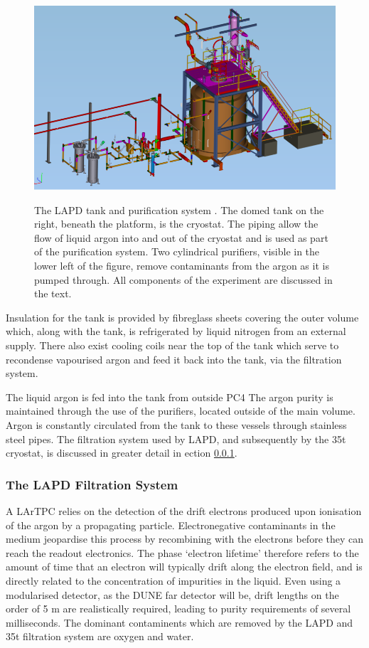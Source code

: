 \begin{figure}[ht]
  \centering
  \includegraphics[width=15cm]{LAPDTankPiping.png}
  \label{fig:LAPDTankPiping}
  \caption{The LAPD tank and purification system \cite{LAPD}.  The domed tank on the right, beneath the platform, is the cryostat.  The piping allow the flow of liquid argon into and out of the cryostat and is used as part of the purification system.  Two cylindrical purifiers, visible in the lower left of the figure, remove contaminants from the argon as it is pumped through.  All components of the experiment are discussed in the text.}
\end{figure}

Insulation for the tank is provided by fibreglass sheets covering the outer volume which, along with the tank, is refrigerated by liquid nitrogen from an external supply.  There also exist cooling coils near the top of the tank which serve to recondense vapourised argon and feed it back into the tank, via the filtration system.

The liquid argon is fed into the tank from outside PC4  The argon purity is maintained through the use of the purifiers, located outside of the main volume.  Argon is constantly circulated from the tank to these vessels through stainless steel pipes.  The filtration system used by LAPD, and subsequently by the 35t cryostat, is discussed in greater detail in ection \ref{sec:LAPDFiltration}.

\subsubsection{The LAPD Filtration System}\label{sec:LAPDFiltration}

A LArTPC relies on the detection of the drift electrons produced upon ionisation of the argon by a propagating particle.  Electronegative contaminants in the medium jeopardise this process by recombining with the electrons before they can reach the readout electronics.  The phase `electron lifetime' therefore refers to the amount of time that an electron will typically drift along the electron field, and is directly related to the concentration of impurities in the liquid.  Even using a modularised detector, as the DUNE far detector will be, drift lengths on the order of 5 m are realistically required, leading to purity requirements of several milliseconds.  The dominant contaminents which are removed by the LAPD and 35t filtration system are oxygen and water.

